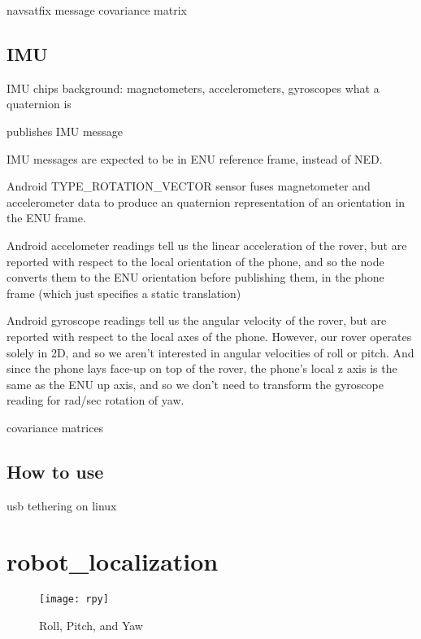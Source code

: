 navsatfix message
covariance matrix

\subsection{IMU}
IMU chips background: magnetometers, accelerometers, gyroscopes
what a quaternion is

publishes IMU message

IMU messages are expected to be in ENU reference frame, instead of NED.

Android TYPE\_ROTATION\_VECTOR sensor fuses magnetometer and accelerometer data to produce an quaternion representation of an orientation in the ENU frame.

Android accelometer readings tell us the linear acceleration of the rover, but are reported with respect to the local orientation of the phone, and so the node converts them to the ENU orientation before publishing them, in the phone frame (which just specifies a static translation)

Android gyroscope readings tell us the angular velocity of the rover, but are reported with respect to the local axes of the phone. However, our rover operates solely in 2D, and so we aren't interested in angular velocities of roll or pitch. And since the phone lays face-up on top of the rover, the phone's local z axis is the same as the ENU up axis, and so we don't need to transform the gyroscope reading for rad/sec rotation of yaw.



covariance matrices

\subsection{How to use}
usb tethering
on linux


\section{robot\_localization} \label{sectionRobotLocalization}

\begin{wrapfigure}{r}{0.5\textwidth} \label{fig:rpy}
	\caption{Roll, Pitch, and Yaw \cite{fig_rpy}}
	\centering
	\texttt{[image: rpy]}
\end{wrapfigure}

